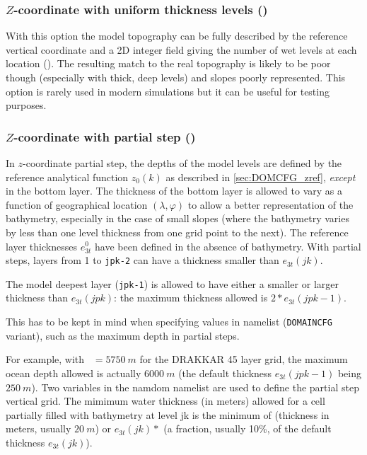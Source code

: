 \documentclass[../main/NEMO_manual]{subfiles}
\begin{document}
\subsubsection[$Z$-coordinate with uniform thickness levels (\forcode{ln_zco})]{$Z$-coordinate with uniform thickness levels (\protect{})}
\label{subsec:DOMCFG_zco}

With this option the model topography can be fully described by the reference vertical
coordinate and a 2D integer field giving the number of wet levels at each location
(). The resulting match to the real topography is likely to be poor
though (especially with thick, deep levels) and slopes poorly represented. This option is
rarely used in modern simulations but it can be useful for testing purposes.

\subsubsection[$Z$-coordinate with partial step (\forcode{ln_zps})]{$Z$-coordinate with partial step (\protect{})}
\label{subsec:DOMCFG_zps}

In $z$-coordinate partial step, the depths of the model levels are defined by the
reference analytical function $z_0(k)$ as described in \autoref{sec:DOMCFG_zref},
\textit{except} in the bottom layer.  The thickness of the bottom layer is allowed to vary
as a function of geographical location $(\lambda,\varphi)$ to allow a better
representation of the bathymetry, especially in the case of small slopes (where the
bathymetry varies by less than one level thickness from one grid point to the next).  The
reference layer thicknesses $e_{3t}^0$ have been defined in the absence of bathymetry.
With partial steps, layers from 1 to \texttt{jpk-2} can have a thickness smaller than
$e_{3t}(jk)$.

The model deepest layer (\texttt{jpk-1}) is allowed to have either a smaller or larger
thickness than $e_{3t}(jpk)$: the maximum thickness allowed is $2*e_{3t}(jpk - 1)$.

This has to be kept in mind when specifying values in  namelist
(\texttt{DOMAINCFG} variant), such as the maximum depth  in partial steps.

For example, with ~$= 5750~m$ for the DRAKKAR 45 layer grid, the maximum ocean
depth allowed is actually $6000~m$ (the default thickness $e_{3t}(jpk - 1)$ being
$250~m$).  Two variables in the namdom namelist are used to define the partial step
vertical grid.  The mimimum water thickness (in meters) allowed for a cell partially
filled with bathymetry at level jk is the minimum of  (thickness in
meters, usually $20~m$) or $e_{3t}(jk)*$ (a fraction, usually 10\%, of
the default thickness $e_{3t}(jk)$).
\end{document}
